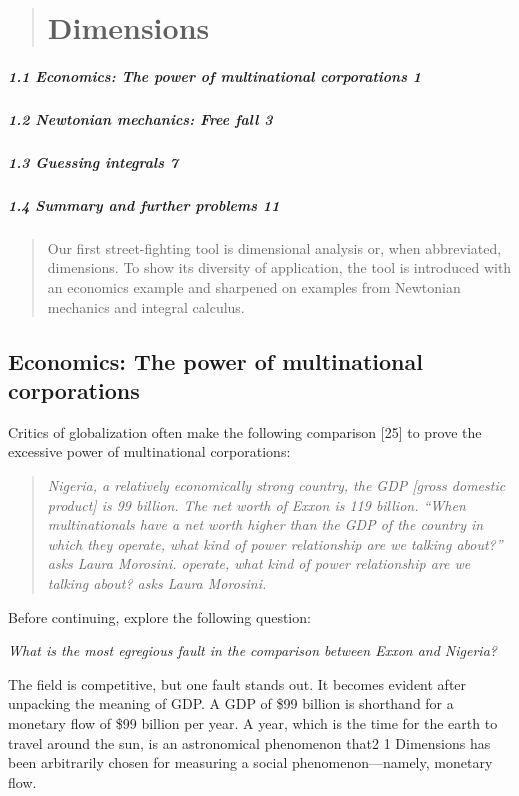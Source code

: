 \documentclass[12pt,a4paper]{article}
\begin{document}
 
\begin{quote}
\section{
Dimensions}
\end{quote}

\subparagraph{1.1 Economics: The power of multinational corporations 1}
\subparagraph{1.2 Newtonian mechanics: Free fall 3}
\subparagraph{1.3 Guessing integrals 7}
\subparagraph{1.4 Summary and further problems 11}

\begin{quote}
Our first street-fighting tool is dimensional analysis or, when abbreviated,
dimensions. To show its diversity of application, the tool is introduced
with an economics example and sharpened on examples from Newtonian
mechanics and integral calculus.
\end{quote}
\begin{center}
\subsection{Economics: The power of multinational corporations}
\end{center}
Critics of globalization often make the following comparison [25] to prove
the excessive power of multinational corporations:

\begin{quote}
\textit{Nigeria, a relatively economically strong country, the GDP [gross domestic
product] is 99 billion. The net worth of Exxon is 119 billion. “When multinationals have a net worth higher than the GDP of the country in which they
operate, what kind of power relationship are we talking about?” asks Laura
Morosini.
operate, what kind of power relationship are we talking about?  asks Laura
Morosini.}
\end{quote} 
Before continuing, explore the following question:

 {\it What is the most egregious fault in the comparison between Exxon and Nigeria?}

The field is competitive, but one fault stands out. It becomes evident after
unpacking the meaning of GDP. A GDP of \$99 billion is shorthand for
a monetary flow of \$99 billion per year. A year, which is the time for
the earth to travel around the sun, is an astronomical phenomenon that2 1 Dimensions
has been arbitrarily chosen for measuring a social phenomenon—namely,
monetary flow.
\end{document}
